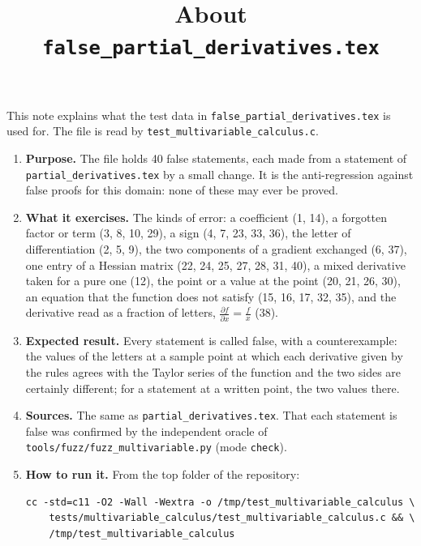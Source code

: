 \documentclass[11pt,a4paper]{article}
\title{About \texttt{false\_partial\_derivatives.tex}}
\author{}
\date{}
\begin{document}
\maketitle
This note explains what the test data in \texttt{false\_partial\_derivatives.tex} is used for. The file is read by \texttt{test\_multivariable\_calculus.c}.

\begin{enumerate}
\item \textbf{Purpose.} The file holds 40 false statements, each made from a statement of \texttt{partial\_derivatives.tex} by a small change. It is the anti-regression against false proofs for this domain: none of these may ever be proved.

\item \textbf{What it exercises.} The kinds of error: a coefficient (1, 14), a forgotten factor or term (3, 8, 10, 29), a sign (4, 7, 23, 33, 36), the letter of differentiation (2, 5, 9), the two components of a gradient exchanged (6, 37), one entry of a Hessian matrix (22, 24, 25, 27, 28, 31, 40), a mixed derivative taken for a pure one (12), the point or a value at the point (20, 21, 26, 30), an equation that the function does not satisfy (15, 16, 17, 32, 35), and the derivative read as a fraction of letters, $\frac{\partial f}{\partial x} = \frac{f}{x}$ (38).

\item \textbf{Expected result.} Every statement is called false, with a counterexample: the values of the letters at a sample point at which each derivative given by the rules agrees with the Taylor series of the function and the two sides are certainly different; for a statement at a written point, the two values there.

\item \textbf{Sources.} The same as \texttt{partial\_derivatives.tex}. That each statement is false was confirmed by the independent oracle of \texttt{tools/fuzz/fuzz\_multivariable.py} (mode \texttt{check}).

\item \textbf{How to run it.} From the top folder of the repository:
\begin{verbatim}
cc -std=c11 -O2 -Wall -Wextra -o /tmp/test_multivariable_calculus \
    tests/multivariable_calculus/test_multivariable_calculus.c && \
    /tmp/test_multivariable_calculus
\end{verbatim}
\end{enumerate}
\end{document}
